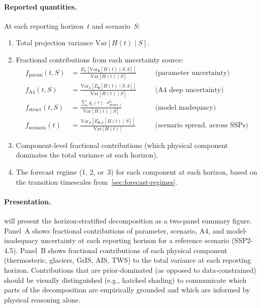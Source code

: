 \documentclass[11pt]{article}
\begin{document}
\paragraph{Reported quantities.}  At each reporting horizon~$t$ and scenario~$S$:
\begin{enumerate}
  \item Total projection variance $\text{Var}[H(t) \mid S]$.
  \item Fractional contributions from each uncertainty source:
    \begin{align}
      f_{\text{param}}(t, S) &= \frac{E_k\!\left[\text{Var}_{\boldsymbol{\theta}}[H(t) \mid S, k]\right]}{\text{Var}[H(t) \mid S]} &\quad &\text{(parameter uncertainty)} \\
      f_{\text{A4}}(t, S) &= \frac{\text{Var}_k\!\left[E_{\boldsymbol{\theta}}[H(t) \mid S, k]\right]}{\text{Var}[H(t) \mid S]} &\quad &\text{(A4 deep uncertainty)} \\
      f_{\text{struct}}(t, S) &= \frac{\sum_i g_i(\tau) \cdot \sigma_{\text{struct},i}^2}{\text{Var}[H(t) \mid S]} &\quad &\text{(model inadequacy)} \\
      f_{\text{scenario}}(t) &= \frac{\text{Var}_S\!\left[E_{\boldsymbol{\theta},k}[H(t) \mid S]\right]}{\text{Var}[H(t)]} &\quad &\text{(scenario spread, across SSPs)}
    \end{align}
  \item Component-level fractional contributions (which physical component dominates the total variance at each horizon).
  \item The forecast regime (1, 2, or~3) for each component at each horizon, based on the transition timescales from~\cref{sec:forecast-regimes}.
\end{enumerate}

\paragraph{Presentation.}   will present the horizon-stratified decomposition as a two-panel summary figure.  Panel~A shows fractional contributions of parameter, scenario, A4, and model-inadequacy uncertainty at each reporting horizon for a reference scenario (SSP2-4.5).  Panel~B shows fractional contributions of each physical component (thermosteric, glaciers, GrIS, AIS, TWS) to the total variance at each reporting horizon.  Contributions that are prior-dominated (as opposed to data-constrained) should be visually distinguished (e.g., hatched shading) to communicate which parts of the decomposition are empirically grounded and which are informed by physical reasoning alone.
\end{document}
